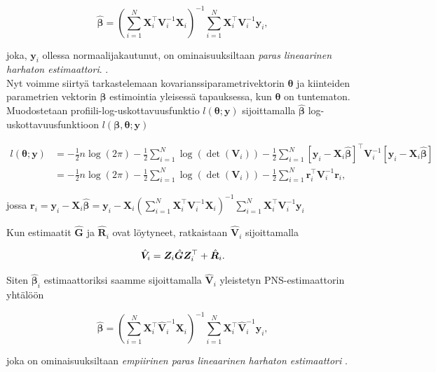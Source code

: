 \documentclass[finnish]{docopts}
\begin{document}
$$
\hat{\bm{\beta}} =  (\sum\limits_{i=1}^{N} \bm{X}_{i}^\top \bm{V}_i^{-1} \bm{X}_{i})^{-1} \sum\limits_{i=1}^{N} \bm{X}_{i}^\top \bm{V}_i^{-1} \bm{y}_i,
$$

joka, $\bm{y}_i$ ollessa normaalijakautunut, on ominaisuuksiltaan \textit{paras lineaarinen harhaton estimaattori}. \citep{west14}.\\

Nyt voimme siirtyä tarkastelemaan kovarianssiparametrivektorin $\bm{\theta}$ ja kiinteiden parametrien vektorin $\bm{\beta}$ estimointia yleisessä tapauksessa, kun $\bm{\theta}$ on tuntematon.\\

Muodostetaan profiili-log-uskottavuus\-funktio $l(\bm{\theta} ; \bm{y})$ sijoittamalla $\hat{\bm{\beta}}$ log-uskottavuus\-funktioon $l(\bm{\beta}, \bm{\theta};\bm{y})$

$$
\begin{aligned}
l(\bm{\theta};\bm{y}) &= -\frac{1}{2} n \log (2\pi) -\frac{1}{2} \sum\limits_{i=1}^{N} \log (\det (\bm{V}_i)) -\frac{1}{2} \sum\limits_{i=1}^{N} [\bm{y}_i - \bm{X}_i \hat{\bm{\beta}}]^\top \bm{V}_i^{-1} [\bm{y}_i - \bm{X}_i \hat{\bm{\beta}}] \\
&= -\frac{1}{2} n \log (2\pi) -\frac{1}{2} \sum\limits_{i=1}^{N} \log (\det (\bm{V}_i)) -\frac{1}{2} \sum\limits_{i=1}^{N} \bm{r}_{i}^\top \bm{V}_i^{-1} \bm{r}_{i},
\end{aligned}
$$

jossa $\bm{r}_i = \bm{y}_i - \bm{X}_i \hat{\bm{\beta}} = \bm{y}_i - \bm{X}_i (\sum\limits_{i=1}^{N} \bm{X}_{i}^\top \bm{V}_i^{-1} \bm{X}_{i})^{-1} \sum\limits_{i=1}^{N} \bm{X}_{i}^\top \bm{V}_i^{-1} \bm{y}_i$

Kun estimaatit $\hat{\bm{G}}$ ja $\hat{\bm{R}}_i$ ovat löytyneet, ratkaistaan $\hat{\bm{V}}_i$ sijoittamalla

$$
\hat{\bm{V}}_i = \bm{Z}_i \hat{\bm{G}} \bm{Z}^\top_i + \hat{\bm{R}}_i \\.
$$

Siten $\hat{\bm{\beta}}_i$ estimaattoriksi saamme sijoittamalla $\hat{\bm{V}}_i$ yleistetyn PNS-estimaattorin yhtälöön

$$
\hat{\bm{\beta}} =  (\sum\limits_{i=1}^{N} \bm{X}_{i}^\top \hat{\bm{V}}_i^{-1} \bm{X}_{i})^{-1} \sum\limits_{i=1}^{N} \bm{X}_{i}^\top \hat{\bm{V}}_i^{-1} \bm{y}_i,
$$

joka on ominaisuuksiltaan \textit{empiirinen paras lineaarinen harhaton estimaattori} \cite{west14}. \\
\end{document}
